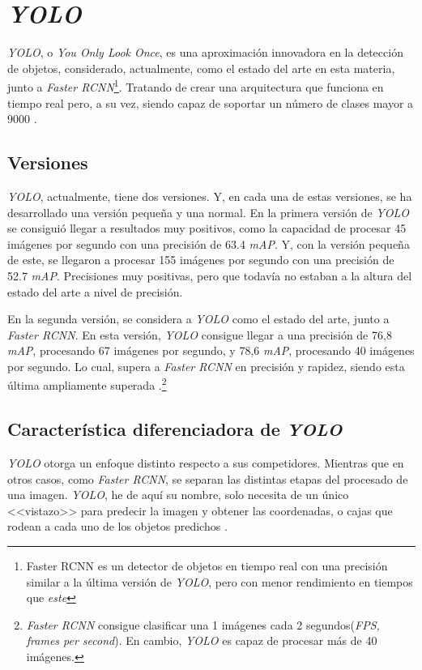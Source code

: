 \section{\textit{YOLO}}

\textit{YOLO}, o \textit{You Only Look Once}, es una aproximación innovadora en la detección de objetos, considerado, actualmente, como el estado del arte en esta materia, junto a \textit{Faster RCNN}\footnote{Faster RCNN es un detector de objetos en tiempo real con una precisión similar a la última versión de \textit{YOLO}, pero con menor rendimiento en tiempos que \textit{este}}. Tratando de crear una arquitectura que funciona en tiempo real pero, a su vez, siendo capaz de soportar un número de clases mayor a 9000 \cite{yolov2}.

\subsection{Versiones}

\textit{YOLO}, actualmente, tiene dos versiones. Y, en cada una de estas versiones, se ha desarrollado una versión pequeña y una normal. En la primera versión de \textit{YOLO} se consiguió llegar a resultados muy positivos, como la capacidad de procesar 45 imágenes por segundo con una precisión de 63.4 \textit{mAP}. Y, con la versión pequeña de este, se llegaron a procesar 155 imágenes por segundo con una precisión de 52.7 \textit{mAP}\cite{yolo}. Precisiones muy positivas, pero que todavía no estaban a la altura del estado del arte a nivel de precisión.

En la segunda versión, se considera a \textit{YOLO} como el estado del arte, junto a \textit{Faster RCNN}. En esta versión, \textit{YOLO} consigue llegar a una precisión de 76,8 \textit{mAP}, procesando 67 imágenes por segundo, y 78,6 \textit{mAP}, procesando 40 imágenes por segundo. Lo cual, supera a \textit{Faster RCNN} en precisión y rapidez, siendo esta última ampliamente superada \cite{yolov2}.\footnote{\textit{Faster RCNN} consigue clasificar una 1 imágenes cada 2 segundos(\textit{FPS, frames per second}). En cambio, \textit{YOLO} es capaz de procesar más de 40 imágenes.}

\subsection{Característica diferenciadora de \textit{YOLO}}

\textit{YOLO} otorga un enfoque distinto respecto a sus competidores. Mientras que en otros casos, como \textit{Faster RCNN}, se separan las distintas etapas del procesado de una imagen. \textit{YOLO}, he de aquí su nombre, solo necesita de un único <<vistazo>> para predecir la imagen y obtener las coordenadas, o cajas que rodean a cada uno de los objetos predichos \cite{yolo}.

